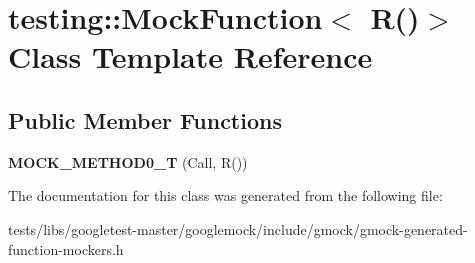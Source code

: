 \hypertarget{classtesting_1_1MockFunction_3_01R_07_08_4}{}\section{testing\+:\+:Mock\+Function$<$ R()$>$ Class Template Reference}
\label{classtesting_1_1MockFunction_3_01R_07_08_4}
\subsection*{Public Member Functions}
\begin{DoxyCompactItemize}
\item 
\mbox{\label{classtesting_1_1MockFunction_3_01R_07_08_4_a08e7016e3e060a5cd375b66ff0cc04e8}} 
{\bfseries M\+O\+C\+K\+\_\+\+M\+E\+T\+H\+O\+D0\+\_\+T} (Call, R())
\end{DoxyCompactItemize}


The documentation for this class was generated from the following file\+:\begin{DoxyCompactItemize}
\item 
tests/libs/googletest-\/master/googlemock/include/gmock/gmock-\/generated-\/function-\/mockers.\+h\end{DoxyCompactItemize}
